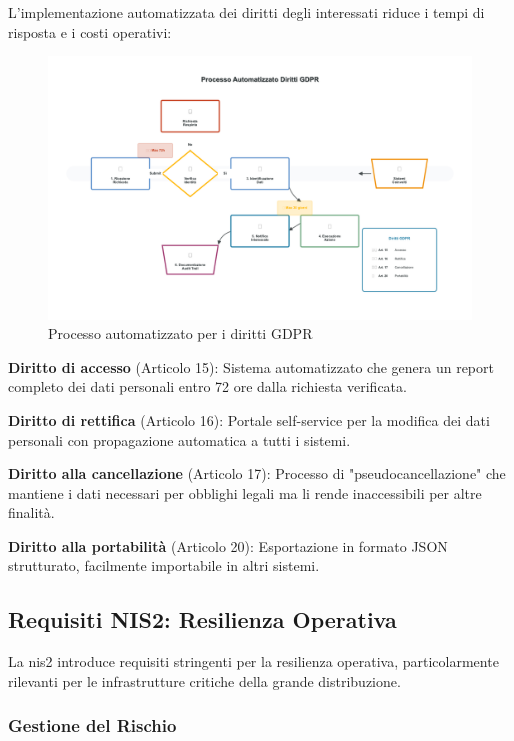 L'implementazione automatizzata dei diritti degli interessati riduce i tempi di risposta e i costi operativi:

\begin{figure}[htbp]
\centering
\includegraphics[width=1.1\textwidth]{thesis_figures/cap4/figura_4_3_processo_premium.pdf}
\caption{Processo automatizzato per i diritti GDPR}
\label{fig:processo_diritti}
\end{figure}

\textbf{Diritto di accesso} (Articolo 15): Sistema automatizzato che genera un report completo dei dati personali entro 72 ore dalla richiesta verificata.

\textbf{Diritto di rettifica} (Articolo 16): Portale self-service per la modifica dei dati personali con propagazione automatica a tutti i sistemi.

\textbf{Diritto alla cancellazione} (Articolo 17): Processo di "pseudocancellazione" che mantiene i dati necessari per obblighi legali ma li rende inaccessibili per altre finalità.

\textbf{Diritto alla portabilità} (Articolo 20): Esportazione in formato JSON strutturato, facilmente importabile in altri sistemi.

\subsection{\texorpdfstring{Requisiti NIS2: Resilienza Operativa}{4.4.3 - Requisiti NIS2: Resilienza Operativa}}
\label{subsec:4.4.3_nis2}

La \gls{nis2} introduce requisiti stringenti per la resilienza operativa, particolarmente rilevanti per le infrastrutture critiche della grande distribuzione.

\subsubsection{\texorpdfstring{Gestione del Rischio}{4.4.3.1 - Gestione del Rischio}}


